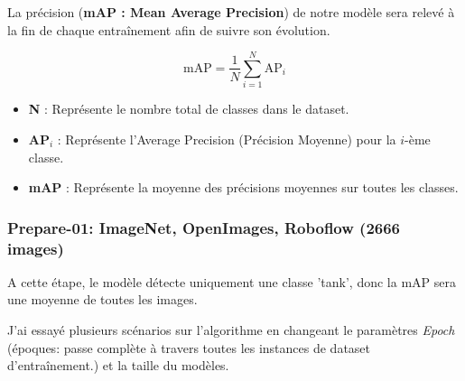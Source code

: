 La précision (\textbf{mAP : Mean Average Precision}) de notre modèle sera relevé à la fin de chaque entraînement afin de suivre son évolution.

\begin{equation}
	\text{mAP} = \frac{1}{N} \sum_{i=1}^{N} \text{AP}_i
\end{equation}

\begin{itemize}
	\item \textbf{N} : Représente le nombre total de classes dans le dataset.
	\item \textbf{AP$_i$} : Représente l'Average Precision (Précision Moyenne) pour la $i$-ème classe.
	\item \textbf{mAP} : Représente la moyenne des précisions moyennes sur toutes les classes.
\end{itemize}



\subsubsection*{Prepare-01: ImageNet, OpenImages, Roboflow (2666 images)}

A cette étape, le modèle détecte uniquement une classe 'tank', donc la mAP sera une moyenne de toutes les images.

J’ai essayé plusieurs scénarios sur l’algorithme en changeant le paramètres \textit{Epoch} (époques: passe complète à travers toutes les instances de dataset d'entraînement.) et la taille du modèles.



